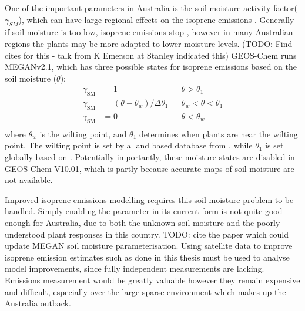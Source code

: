   One of the important parameters in Australia is the soil moisture activity factor($\gamma_{SM}$), which can have large regional effects on the isoprene emissions \parencite{Sindelarova2014,Bauwens2016}.
  Generally if soil moisture is too low, isoprene emissions stop \parencite{Pegoraro2004,Niinemets2010}, however in many Australian regions the plants may be more adapted to lower moisture levels. (TODO: Find cites for this - talk from K Emerson at Stanley indicated this)
  GEOS-Chem runs MEGANv2.1, which has three possible states for isoprene emissions based on the soil moisture ($\theta$):
  \begin{align*}
  \gamma_\mathrm{SM} & = 1 && \theta > \theta_1 \\
  \gamma_\mathrm{SM} & = (\theta-\theta_w)/\Delta\theta_1  && \theta_w < \theta < \theta_1 \\
  \gamma_\mathrm{SM} & = 0 && \theta < \theta_w \\
  \end{align*}
  where $\theta_w$ is the wilting point, and $\theta_1$ determines when plants are near the wilting point.
  The wilting point is set by a land based database from \textcite{Chen2001}, while $\theta_1$ is set globally based on \textcite{Pegoraro2004}.
  Potentially importantly, these moisture states are disabled in GEOS-Chem V10.01, which is partly because accurate maps of soil moisture are not available.
  
  Improved isoprene emissions modelling requires this soil moisture problem to be handled.
  Simply enabling the parameter in its current form is not quite good enough for Australia, due to both the unknown soil moisture and the poorly understood plant responses in this country.
  TODO: cite the paper which could update MEGAN soil moisture parameterisation.
  Using satellite data to improve isoprene emission estimates such as done in this thesis must be used to analyse model improvements, since fully independent measurements are lacking.
  Emissions measurement would be greatly valuable however they remain expensive and difficult, especially over the large sparse environment which makes up the Australia outback.
